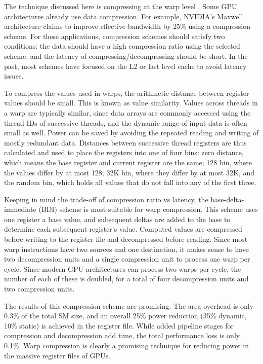 \documentclass[prodmode,acmtecs]{acmsmall} %
\begin{document}
The technique discussed here is compressing at the warp level
\cite{WarpCompression}. Some GPU architectures already use data compression. For
example, NVIDIA's Maxwell architecture claims to improve effective bandwidth by
25\% using a compression scheme. For these applications, compression schemes
should satisfy two conditions: the data should have a high compression ratio
using the selected scheme, and the latency of compressing/decompressing should
be short. In the past, most schemes have focused on the L2 or last level cache
to avoid latency issues.

To compress the values used in warps, the arithmetic distance between register
values should be small. This is known as value similarity. Values across threads
in a warp are typically similar, since data arrays are commonly accessed using
the thread IDs of successive threads, and the dynamic range of input data is
often small as well. Power can be saved by avoiding the repeated reading and
writing of mostly redundant data. Distances between successive thread registers
are thus calculated and used to place the registers into one of four bins: zero
distance, which means the base register and current register are the same; 128
bin, where the values differ by at most 128; 32K bin, where they differ by at
most 32K, and the random bin, which holds all values that do not fall into any
of the first three.

Keeping in mind the trade-off of compression ratio vs latency, the
base-delta-immediate (BDI) scheme is most suitable for warp compression. This
scheme uses one register a base value, and subsequent deltas are added to the
base to determine each subsequent register's value. Computed values are
compressed before writing to the register file and decompressed before reading.
Since most warp instructions have two sources and one destination, it makes
sense to have two decompression units and a single compression unit to process
one warp per cycle. Since modern GPU architectures can process two warps per
cycle, the number of each of these is doubled, for a total of four decompression
units and two compression units.

The results of this compression scheme are promising. The area overhead is only
0.3\% of the total SM size, and an overall 25\% power reduction (35\% dynamic,
10\% static) is achieved in the register file. While added pipeline stages for
compression and decompression add time, the total performance loss is only
0.1\%. Warp compression is clearly a promising technique for reducing power in
the massive register files of GPUs.
\end{document}
